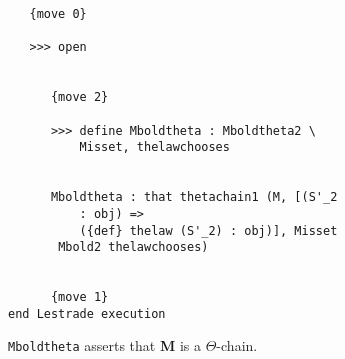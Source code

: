 \documentclass[12pt]{article}
\begin{document}
\begin{verbatim}
   {move 0}

   >>> open


      {move 2}

      >>> define Mboldtheta : Mboldtheta2 \
          Misset, thelawchooses


      Mboldtheta : that thetachain1 (M, [(S'_2 
          : obj) => 
          ({def} thelaw (S'_2) : obj)], Misset 
       Mbold2 thelawchooses)


      {move 1}
end Lestrade execution
\end{verbatim}

{\tt Mboldtheta} asserts that {\bf M} is a $\Theta$-chain. 
\end{document}
